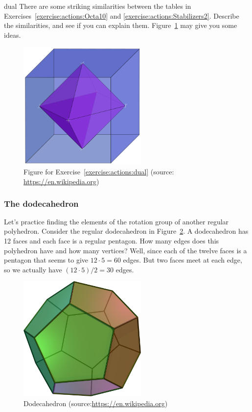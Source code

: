\begin{exercise}{dual}
There are some striking similarities between the tables in Exercises~\ref{exercise:actions:Octa10} and \ref{exercise:actions:Stabilizers2}. Describe the similarities, and see if you can explain them. Figure~\ref{fig:Dual} may give you some ideas.
\end{exercise}

\begin{figure}[ht]
\begin{center}
\includegraphics[width=2.5in]{images/Dual_Cube-Octahedron.png}
\caption{\label{fig:Dual}Figure for Exercise~\ref{exercise:actions:dual} (source: \url{https://en.wikipedia.org})}

\end{center}
\end{figure}

\subsubsection*{The dodecahedron}
Let's practice finding the elements of the rotation group of another regular polyhedron.  Consider the regular dodecahedron in Figure~\ref{fig:Dodeca}.  A dodecahedron has 12 faces and each face is a regular pentagon.  How many edges does this polyhedron have and how many vertices?  Well, since each of the twelve faces is a pentagon that seems to give $12\cdot 5=60$ edges.  But two faces meet at each edge, so we actually have $(12\cdot 5)/2=30$ edges.

\begin{figure}[ht]
\begin{center}
\includegraphics[width=2.5in]{images/Dodecahedron.png}
\caption{\label{fig:Dodeca}Dodecahedron (source:\url{https://en.wikipedia.org})}

\end{center}
\end{figure}

